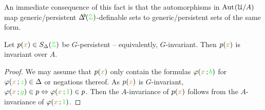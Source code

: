 An immediate consequence of this fact is that the automorphisms in ${\rm Aut\kern.15ex}(\EuScript U/A)$ map generic/persistent $\BDelta(\grZ)$-definable sets to generic/persistent sets of the same form.



\begin{fact} 
  Let $p({\color{brown} x})\in S_\Delta({\color{green}\EuScript Z})$ be $G$-persistent -- equivalently, $G$-invariant.
  Then $p({\color{brown} x})$ is invariant over $A$.
\end{fact}

\begin{proof}
  We may assume that $p({\color{brown} x})$ only contain the formulas $\varphi({\color{brown} x}\,;{\color{green} b})$ for $\varphi({\color{brown} x}\,;{\color{green} z})\in\Delta$ or negations thereof.
  As $p({\color{brown} x})$ is $G$-invariant, $\varphi({\color{brown} x}\,;{\color{green} g})\in p\Leftrightarrow\varphi({\color{brown} x}\,;{\color{green} 1})\in p$.
  Then the $A$-invariance of $p({\color{brown} x})$ follows from the $A$-invariance of $\varphi({\color{brown} x}\,;{\color{green} 1})$.
\end{proof}





